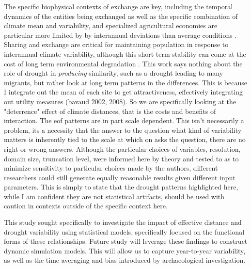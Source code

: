 \documentclass[fleqn,10pt]{wlscirep}
\begin{document}
The specific biophysical contexts of exchange are key, including the temporal dynamics of the entities being exchanged as well as the specific combination of climate mean and variability, and specialized agricultural economies are particular more limited by by interannual deviations than average conditions \cite{Freeman2014}. Sharing and exchange are critical for maintaining population in response to interannual climate variability, although this short term stability can come at the cost of long term environmental degradation \cite{Janssen2010}.
This work says nothing about the role of drought in \textit{producing} similarity, such as a drought leading to many migrants, but rather look at long term patterns in the differences. This is because I integrate out the mean of each site to get attractiveness, effectively integrating out utility measures (bavaud 2002, 2008). So we are specifically looking at the "deterrence" effect of climate distances, that is the costs and benefits of interaction.
The eof patterns are in part scale dependent. This isn't necessarily a problem, its a necessity that the answer to the question what kind of variability matters is inherently tied to the scale at which on asks the question, there are no right or wrong answers. Although the particular choices of variables, resolution, domain size, truncation level, were informed here by theory and tested to as to minimize sensitivity to particular choices made by the authors, different researchers could still generate equally reasonable results given  different input parameters.  This is simply to state that the drought patterns highlighted here, while I am confident they are not statistical artifacts, should be used with caution in contexts outside of the specific context here.

This study sought specifically to investigate the impact of effective distance and drought variability using statistical models, specifically focused on the functional forms of these relationships. Future study will leverage these findings to construct dynamic simulation models. This will allow us to capture year-to-year variability, as well as the time averaging and bias introduced by archaeological investigation.
\end{document}
